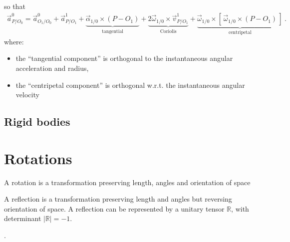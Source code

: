 \documentclass[letterpaper,10pt,english]{jupyterBook}
\begin{document}
\sphinxAtStartPar
so that
\begin{equation}\label{equation:ch/kinematics-relative:eq:relative:point:acc}
\begin{split}
\vec{a}^0_{P/O_0} = \vec{a}^0_{O_1/O_0} + \vec{a}^{1}_{P/O_1} + \underbrace{\vec{\alpha}_{1/0} \times (P - O_1)}_{\text{tangential}} + \underbrace{2 \vec{\omega}_{1/0} \times \vec{v}^1_{P/O_1}}_{\text{Coriolis}} + \underbrace{\vec{\omega}_{1/0} \times [ \, \vec{\omega}_{1/0} \times (P - O_1) \, ]}_{\text{centripetal}} \ .
\end{split}
\end{equation}
\sphinxAtStartPar
where:
\begin{itemize}
\item {} 
\sphinxAtStartPar
the “tangential component” is orthogonal to the instantaneous angular acceleration and radius,

\item {} 
\sphinxAtStartPar
the “centripetal component” is orthogonal w.r.t. the instantaneous angular velocity

\end{itemize}

\sphinxAtStartPar
{}  


\subsection{Rigid bodies}
\label{\detokenize{ch/kinematics-relative:rigid-bodies}}
\sphinxAtStartPar
{}

\sphinxAtStartPar
{}

\sphinxAtStartPar
{}

\sphinxstepscope


\section{Rotations}
\label{\detokenize{ch/kinematics-rotations:rotations}}\label{\detokenize{ch/kinematics-rotations:classical-mechanics-kinematics-rotations}}\label{\detokenize{ch/kinematics-rotations::doc}}
\sphinxAtStartPar
A rotation is a transformation preserving length, angles and orientation of space%
\begin{footnote}[1]\sphinxAtStartFootnote
A reflection is a transformation preserving length and angles but reversing orientation of space. A reflection can be represented by a unitary tensor \(\mathbb{R}\), with determinant \(|\mathbb{R}| = -1\).
%
\end{footnote}.
\end{document}
